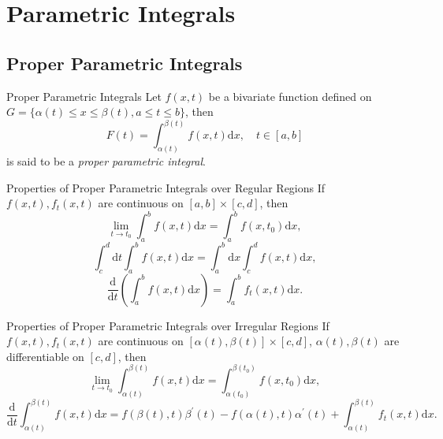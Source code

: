 
\section{Parametric Integrals}

\subsection{Proper Parametric Integrals}

\begin{definition}{Proper Parametric Integrals}{}
  Let $f(x, t)$ be a bivariate function defined on $G = \{\alpha(t) \leq x \leq
  \beta(t), a \leq t \leq b\}$,
  then
  \begin{equation}
    F(t) = \int_{\alpha(t)}^{\beta(t)} f(x, t)\mathrm{d} x, \quad t \in [a, b]
  \end{equation}
  is said to be a \emph{proper parametric integral}.
\end{definition}

\begin{proposition}{Properties of Proper Parametric Integrals over Regular Regions}{}
  If $f(x, t), f_t(x, t)$ are continuous on $[a, b] \times [c, d]$, then
  \begin{equation}
    \lim \limits _{t \rightarrow t_0} \int_a^b f(x, t)\mathrm{d} x
    = \int_a^b f(x, t_0) \mathrm{d} x,
  \end{equation}
  \begin{equation}
    \int_{c}^{d}\mathrm{d}t\int_{a}^{b}f(x,t)\mathrm{d}x=\int_{a}^{b}\mathrm{d}x\int_{c}^{d}f(x,t)\mathrm{d}x,
  \end{equation}
  \begin{equation}
    \frac{\mathrm{d}}{\mathrm{d} t} \left( \int_a^b f(x, t)\mathrm{d}x \right)
    = \int_a^b f_t(x, t)\mathrm{d} x.
  \end{equation}
\end{proposition}

\begin{proposition}{Properties of Proper Parametric Integrals over Irregular Regions}{}
  If $f(x, t), f_t(x, t)$ are continuous on $[\alpha(t), \beta(t)] \times [c, d]$,
  $\alpha(t), \beta(t)$ are differentiable on $[c, d]$, then
  \begin{equation}
    \lim \limits _{t \rightarrow t_0} \int_{\alpha(t)}^{\beta(t)}f(x,t)\mathrm{d} x
    = \int_{\alpha(t_0)}^{\beta(t_0)} f(x, t_0)\mathrm{d} x,
  \end{equation}
  \begin{equation}
    \frac{\mathrm{d}}{\mathrm{d}t} \int_{\alpha(t)}^{\beta(t)} f(x, t)\mathrm{d} x
    = f(\beta(t), t)\beta^{\prime}(t) - f(\alpha(t), t) \alpha^{\prime}(t)
    + \int_{\alpha(t)}^{\beta(t)}f_t(x, t)\mathrm{d} x.
  \end{equation}
\end{proposition}

